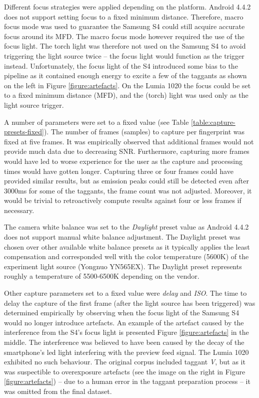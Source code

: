 \documentclass[thesis.tex]{subfiles}
\begin{document}
Different focus strategies were applied depending on the platform. Android 4.4.2 does not support setting focus to a fixed minimum distance. Therefore, macro focus mode was used to guarantee the Samsung S4 could still acquire accurate focus around its MFD. The macro focus mode however required the use of the focus light. The torch light was therefore not used on the Samsung S4 to avoid triggering the light source twice -- the focus light would function as the trigger instead. Unfortunately, the focus light of the S4 introduced some bias to the pipeline as it contained enough energy to excite a few of the taggants as shown on the left in Figure \ref{figure:artefacts}. On the Lumia 1020 the focus could be set to a fixed minimum distance (MFD), and the (torch) light was used only as the light source trigger.

A number of parameters were set to a fixed value (see Table \ref{table:capture-presets-fixed}). The number of frames (samples) to capture per fingerprint was fixed at five frames. It was empirically observed that additional frames would not provide much data due to decreasing SNR. Furthermore, capturing more frames would have led to worse experience for the user as the capture and processing times would have gotten longer. Capturing three or four frames could have provided similar results, but as emission peaks could still be detected even after 3000ms for some of the taggants, the frame count was not adjusted. Moreover, it would be trivial to retroactively compute results against four or less frames if necessary.

The camera white balance was set to the \emph{Daylight} preset value as Android 4.4.2 does not support manual white balance adjustment. The Daylight preset was chosen over other available white balance presets as it typically applies the least compensation and corresponded well with the color temperature (5600K) of the experiment light source (Yongnuo YN565EX). The Daylight preset represents roughly a temperature of 5500-6500K depending on the vendor.

Other capture parameters set to a fixed value were \emph{delay} and \emph{ISO}. The time to delay the capture of the first frame (after the light source has been triggered) was determined empirically by observing when the focus light of the Samsung S4 would no longer introduce artefacts. An example of the artefact caused by the interference from the S4's focus light is presented Figure \ref{figure:artefacts} in the middle. The interference was believed to have been caused by the decay of the smartphone's led light interfering with the preview feed signal. The Lumia 1020 exhibited no such behaviour. The original corpus included taggant \emph{V}, but as it was suspectible to overexposure artefacts (see the image on the right in Figure \ref{figure:artefacts}) -- due to a human error in the taggant preparation process -- it was omitted from the final dataset.
\end{document}
